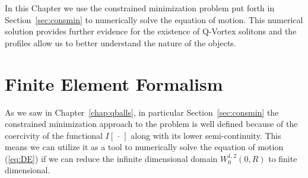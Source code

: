 
In this Chapter we use the constrained minimization problem put forth in
Section~\ref{sec:consmin} to numerically solve the equation of motion. This
numerical solution provides further evidence for the existence of Q-Vortex
solitons and the profiles allow us to better understand the nature of the
objects.

\section{Finite Element Formalism}
As we saw in Chapter~\ref{chap:qballs}, in particular Section~\ref{sec:consmin}
the constrained minimization approach to the problem is well defined because of
the coercivity of the functional \(I[\,\cdot\,]\) along with its lower
semi-continuity. This means we can utilize it as a tool to numerically solve the
equation of motion (\ref{eq:DE}) if we can reduce the infinite dimensional
domain \(W^{1,2}_0(0,R)\) to finite dimensional.

